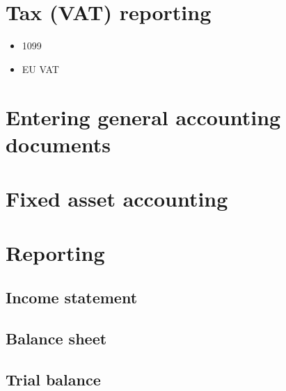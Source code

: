 \section{Tax (VAT) reporting}

\begin{itemize}
\item 1099
\item EU VAT
\end{itemize}

\section{Entering general accounting documents}

\section{Fixed asset accounting}
\label{sec:FixedAssetAccounting}

\section{Reporting}
\subsection{Income statement}
\subsection{Balance sheet}
\subsection{Trial balance}


